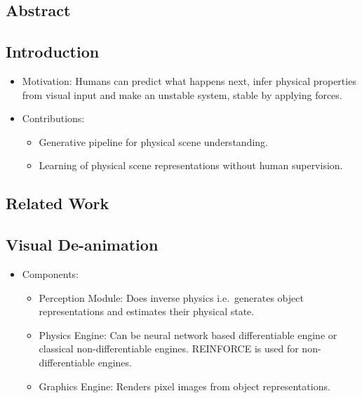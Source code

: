 \documentclass{article}
\begin{document}
    \subsection*{Abstract}

    \subsection{Introduction}\label{subsec:Learning_to_See_Physics_via_Visual_De_animation:introduction}
    \begin{itemize}
        \item Motivation: Humans can predict what happens next, infer physical properties from visual input and make an unstable system, stable by applying forces.
        \item Contributions:
        \begin{itemize}
            \item Generative pipeline for physical scene understanding.
            \item Learning of physical scene representations without human supervision.
        \end{itemize}
    \end{itemize}

    \subsection{Related Work}\label{subsec:Learning_to_See_Physics_via_Visual_De_animation:related-work}

    \subsection{Visual De-animation}\label{subsec:Learning_to_See_Physics_via_Visual_De_animation:visual-de-animation}
    \begin{itemize}
        \item Components:
        \begin{itemize}
            \item Perception Module: Does inverse physics i.e.\ generates object representations and estimates their physical state.
            \item Physics Engine: Can be neural network based differentiable engine or classical non-differentiable engines.
            REINFORCE is used for non-differentiable engines.
            \item Graphics Engine: Renders pixel images from object representations.
        \end{itemize}
    \end{itemize}
\end{document}
